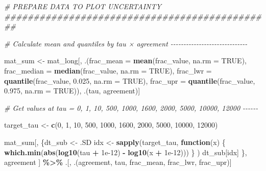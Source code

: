 \documentclass[
  11pt,
]{article}
\newenvironment{Shaded}{\begin{snugshade}}{\end{snugshade}}
\newcommand{\AttributeTok}[1]{\textcolor[rgb]{0.13,0.29,0.53}{#1}}
\newcommand{\CommentTok}[1]{\textcolor[rgb]{0.56,0.35,0.01}{\textit{#1}}}
\newcommand{\ConstantTok}[1]{\textcolor[rgb]{0.56,0.35,0.01}{#1}}
\newcommand{\ControlFlowTok}[1]{\textcolor[rgb]{0.13,0.29,0.53}{\textbf{#1}}}
\newcommand{\DecValTok}[1]{\textcolor[rgb]{0.00,0.00,0.81}{#1}}
\newcommand{\FloatTok}[1]{\textcolor[rgb]{0.00,0.00,0.81}{#1}}
\newcommand{\FunctionTok}[1]{\textcolor[rgb]{0.13,0.29,0.53}{\textbf{#1}}}
\newcommand{\NormalTok}[1]{#1}
\newcommand{\OtherTok}[1]{\textcolor[rgb]{0.56,0.35,0.01}{#1}}
\newcommand{\SpecialCharTok}[1]{\textcolor[rgb]{0.81,0.36,0.00}{\textbf{#1}}}
\begin{document}
\begin{Shaded}
\begin{Highlighting}[]
\CommentTok{\# PREPARE DATA TO PLOT UNCERTAINTY \#\#\#\#\#\#\#\#\#\#\#\#\#\#\#\#\#\#\#\#\#\#\#\#\#\#\#\#\#\#\#\#\#\#\#\#\#\#\#\#\#\#\#\#\#\#}

\CommentTok{\# Calculate mean and quantiles by tau × agreement {-}{-}{-}{-}{-}{-}{-}{-}{-}{-}{-}{-}{-}{-}{-}{-}{-}{-}{-}{-}{-}{-}{-}{-}{-}{-}{-}{-}{-}{-}}

\NormalTok{mat\_sum }\OtherTok{\textless{}{-}}\NormalTok{ mat\_long[, .(}\AttributeTok{frac\_mean =} \FunctionTok{mean}\NormalTok{(frac\_value, }\AttributeTok{na.rm =} \ConstantTok{TRUE}\NormalTok{),}
                        \AttributeTok{frac\_median =} \FunctionTok{median}\NormalTok{(frac\_value, }\AttributeTok{na.rm =} \ConstantTok{TRUE}\NormalTok{),}
                        \AttributeTok{frac\_lwr =} \FunctionTok{quantile}\NormalTok{(frac\_value, }\FloatTok{0.025}\NormalTok{, }\AttributeTok{na.rm =} \ConstantTok{TRUE}\NormalTok{),}
                        \AttributeTok{frac\_upr =} \FunctionTok{quantile}\NormalTok{(frac\_value, }\FloatTok{0.975}\NormalTok{, }\AttributeTok{na.rm =} \ConstantTok{TRUE}\NormalTok{)),}
\NormalTok{                    .(tau, agreement)]}

\CommentTok{\# Get values at tau = 0, 1, 10, 500, 1000, 1600, 2000, 5000, 10000, 12000 {-}{-}{-}{-}{-}{-}}

\NormalTok{target\_tau }\OtherTok{\textless{}{-}} \FunctionTok{c}\NormalTok{(}\DecValTok{0}\NormalTok{, }\DecValTok{1}\NormalTok{, }\DecValTok{10}\NormalTok{, }\DecValTok{500}\NormalTok{, }\DecValTok{1000}\NormalTok{, }\DecValTok{1600}\NormalTok{, }\DecValTok{2000}\NormalTok{, }\DecValTok{5000}\NormalTok{, }\DecValTok{10000}\NormalTok{, }\DecValTok{12000}\NormalTok{)}

\NormalTok{mat\_sum[, \{dt\_sub }\OtherTok{\textless{}{-}}\NormalTok{ .SD}
\NormalTok{idx }\OtherTok{\textless{}{-}} \FunctionTok{sapply}\NormalTok{(target\_tau, }\ControlFlowTok{function}\NormalTok{(x) \{}
  \FunctionTok{which.min}\NormalTok{(}\FunctionTok{abs}\NormalTok{(}\FunctionTok{log10}\NormalTok{(tau }\SpecialCharTok{+} \FloatTok{1e{-}12}\NormalTok{) }\SpecialCharTok{{-}} \FunctionTok{log10}\NormalTok{(x }\SpecialCharTok{+} \FloatTok{1e{-}12}\NormalTok{)))}
\NormalTok{      \}}
\NormalTok{    )}
\NormalTok{    dt\_sub[idx]}
\NormalTok{  \},}
\NormalTok{  agreement}
\NormalTok{] }\SpecialCharTok{\%\textgreater{}\%}
\NormalTok{  .[, .(agreement, tau, frac\_mean, frac\_lwr, frac\_upr)]}
\end{Highlighting}
\end{Shaded}
\end{document}
